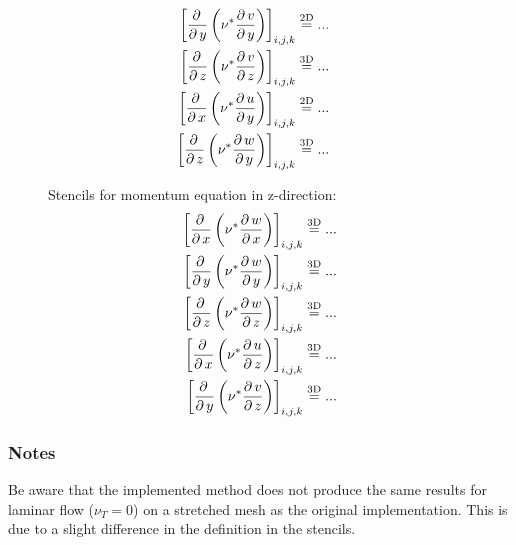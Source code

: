 \documentclass[11pt,a4paper]{article}
\begin{document}
\begin{landscape}
\begin{figure}[htbp]
\begin{minipage}{0.49\textheight}
\begin{align*}
%
%
%
%
\\
\left[ \abl{}{y}\left( \nu^*\abl{v}{y} \right) \right]_{i,j,k}&\eqvd ...
%
%
%
%
\\
\left[ \abl{}{z}\left( \nu^*\abl{v}{z} \right) \right]_{i,j,k}&\eqvdd  ...
%
%
%
%
\\
\left[ \abl{}{x}\left( \nu^*\abl{u}{y} \right) \right]_{i,j,k}&\eqvd  ...
%
%
%
%
\\
\left[ \abl{}{z}\left( \nu^*\abl{w}{y} \right) \right]_{i,j,k}&\eqvdd ...
\\
\end{align*}
\end{minipage}\qquad\qquad\qquad\qquad\qquad\qquad\qquad\qquad
\begin{minipage}{0.49\textheight}
Stencils for momentum equation in z-direction:
\begin{align*}
\left[ \abl{}{x}\left( \nu^*\abl{w}{x} \right) \right]_{i,j,k}&\eqvdd ...
%
%
%
%
\\
\left[ \abl{}{y}\left( \nu^*\abl{w}{y} \right) \right]_{i,j,k}&\eqvdd ...
%
%
%
%
\\
\left[ \abl{}{z}\left( \nu^*\abl{w}{z} \right) \right]_{i,j,k}&\eqvdd ...
%
%
%
%
\\
\left[ \abl{}{x}\left( \nu^*\abl{u}{z} \right) \right]_{i,j,k}&\eqvdd ...
%
%
%
%
\\
\left[ \abl{}{y}\left( \nu^*\abl{v}{z} \right) \right]_{i,j,k}&\eqvdd ...
\\
\end{align*}
\end{minipage}
\end{figure}



\end{landscape}


\clearpage

\subsubsection*{Notes}
\noindent Be aware that the implemented method does not produce the same results for laminar flow ($\nu_T=0$) on a stretched mesh as the original implementation. This is due to a slight difference in the definition in the stencils.

\vspace{0.5cm}
\end{document}
